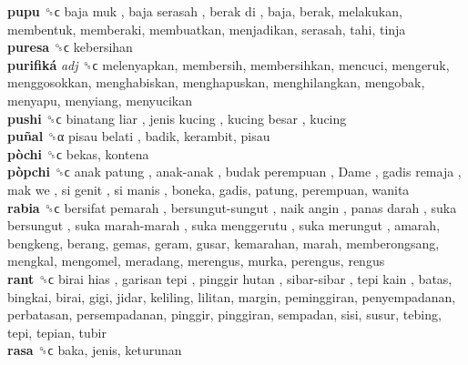 \textbf{pupu} ␝ϲ   baja muk ,  baja serasah ,  berak di , baja, berak, melakukan, membentuk, memberaki, membuatkan, menjadikan, serasah, tahi, tinja  \\
\textbf{puresa} ␝ϲ  kebersihan  \\
\textbf{purifiká} \emph{adj}  ␝ϲ  melenyapkan, membersih, membersihkan, mencuci, mengeruk, menggosokkan, menghabiskan, menghapuskan, menghilangkan, mengobak, menyapu, menyiang, menyucikan  \\
\textbf{pushi} ␝ϲ   binatang liar ,  jenis kucing ,  kucing besar , kucing  \\
\textbf{puñal} ␝α   pisau belati , badik, kerambit, pisau  \\
\textbf{pòchi} ␝ϲ  bekas, kontena  \\
\textbf{pòpchi} ␝ϲ   anak patung ,  anak-anak ,  budak perempuan ,  Dame ,  gadis remaja ,  mak we ,  si genit ,  si manis , boneka, gadis, patung, perempuan, wanita  \\
\textbf{rabia} ␝ϲ   bersifat pemarah ,  bersungut-sungut ,  naik angin ,  panas darah ,  suka bersungut ,  suka marah-marah ,  suka menggerutu ,  suka merungut , amarah, bengkeng, berang, gemas, geram, gusar, kemarahan, marah, memberongsang, mengkal, mengomel, meradang, merengus, murka, perengus, rengus  \\
\textbf{rant} ␝ϲ   birai hias ,  garisan tepi ,  pinggir hutan ,  sibar-sibar ,  tepi kain , batas, bingkai, birai, gigi, jidar, keliling, lilitan, margin, peminggiran, penyempadanan, perbatasan, persempadanan, pinggir, pinggiran, sempadan, sisi, susur, tebing, tepi, tepian, tubir  \\
\textbf{rasa} ␝ϲ  baka, jenis, keturunan  \\
